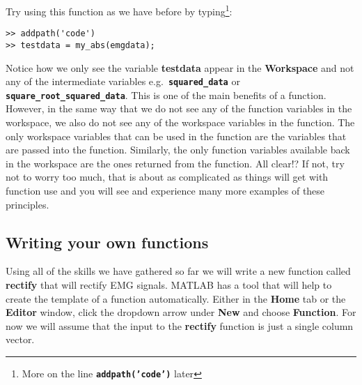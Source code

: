 \documentclass[12pt,a4paper]{article}
\begin{document}
Try using this function as we have before by typing\footnote{More on the line \textbf{\texttt{addpath('code')}} later}:
\begin{lstlisting}[style=Matlab-editor]
>> addpath('code')
>> testdata = my_abs(emgdata);
\end{lstlisting}
Notice how we only see the variable \textbf{testdata} appear in the \textbf{Workspace} and not any of the intermediate variables e.g.~\textbf{\texttt{squared\_data}} or \textbf{\texttt{square\_root\_squared\_data}}.  
This is one of the main benefits of a function.  
However, in the same way that we do not see any of the function variables in the workspace, we also do not see any of the workspace variables in the function.  
The only workspace variables that can be used in the function are the variables that are passed into the function.  
Similarly, the only function variables available back in the workspace are the ones returned from the function.  
All clear!?  
If not, try not to worry too much, that is about as complicated as things will get with function use and you will see and experience many more examples of these principles.

\subsection{Writing your own functions}
Using all of the skills we have gathered so far we will write a new function called \textbf{rectify} that will rectify EMG signals.  
MATLAB has a tool that will help to create the template of a function automatically.  
Either in the \textbf{Home} tab or the \textbf{Editor} window, click the dropdown arrow under \textbf{New} and choose \textbf{Function}.  
For now we will assume that the input to the \textbf{rectify} function is just a single column vector.
\end{document}

